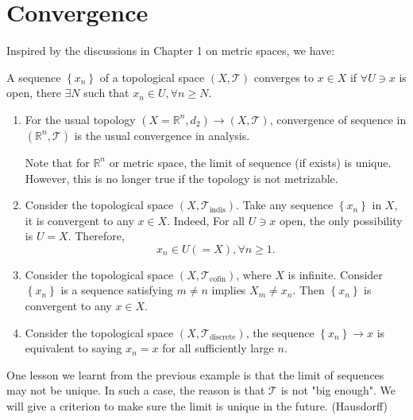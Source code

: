 \section{Convergence}
Inspired by the discussions in Chapter 1 on metric spaces, we have:
\begin{definition}[Convergence] A sequence \(\left\{  x_n\right\}\) of a topological space $(X, \mathcal{T})$ converges to \(x \in  X\) if \(\forall U \ni  x\) is open, there \(\exists N\) such that \(x_n \in  U,\forall n \geq  N\).
\end{definition}

\begin{example} \begin{enumerate}
    \item For the usual topology \(\left({X = {\mathbb{R}}^{n},{d}_{2}}\right)  \rightarrow  \left({X,\mathcal{T}}\right)\), convergence of sequence in \(\left({{\mathbb{R}}^{n},\mathcal{T}}\right)\) is the usual convergence in analysis.
    
    Note that for \({\mathbb{R}}^{n}\) or metric space, the limit of sequence (if exists) is unique. However, this is no longer true if the topology is not metrizable.

\item Consider the topological space \(\left({X,{\mathcal{T}}_{\text{indis}}}\right)\). Take any sequence \(\left\{  x_n\right\}\) in \(X\), it is convergent to any \(x \in  X\). Indeed, For all \(U \ni  x\) open, the only possibility is \(U = X\). Therefore,
\[
x_n \in  U\left({ = X}\right),\forall n \geq  1\text{.}
\]

\item Consider the topological space \(\left({X,{\mathcal{T}}_{\text{cofin}}}\right)\), where \(X\) is infinite. Consider \(\left\{  x_n\right\}\) is a sequence satisfying \(m \neq  n\) implies \(X_{m} \neq  x_n\). Then \(\left\{  x_n\right\}\) is convergent to any \(x \in  X\). 

\item Consider the topological space \(\left({X,{\mathcal{T}}_{\text{discrete}}}\right)\), the sequence \(\left\{  x_n\right\}   \rightarrow  x\) is equivalent to saying \(x_n = x\) for all sufficiently large \(n\).
\end{enumerate}

One lesson we learnt from the previous example is that the limit of sequences may not be unique. In such a case, the reason is that \(\mathcal{T}\) is not "big enough". We will give a criterion to make sure the limit is unique in the future. (Hausdorff)


\end{example}
